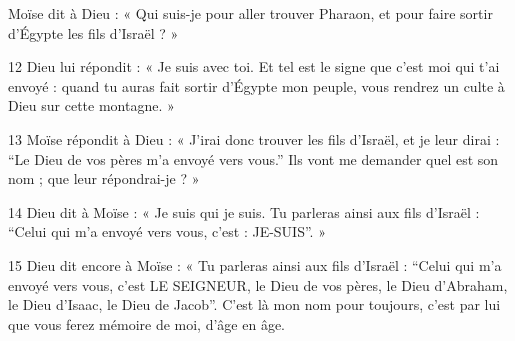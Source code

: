Moïse dit à Dieu : « Qui suis-je pour aller trouver Pharaon, et pour faire sortir d’Égypte les fils d’Israël ? »

12 Dieu lui répondit : « Je suis avec toi. Et tel est le signe que c’est moi qui t’ai envoyé : quand tu auras fait sortir d’Égypte mon peuple, vous rendrez un culte à Dieu sur cette montagne. »

13 Moïse répondit à Dieu : « J’irai donc trouver les fils d’Israël, et je leur dirai : “Le Dieu de vos pères m’a envoyé vers vous.” Ils vont me demander quel est son nom ; que leur répondrai-je ? »

14 Dieu dit à Moïse : « Je suis qui je suis. Tu parleras ainsi aux fils d’Israël : “Celui qui m’a envoyé vers vous, c’est : JE-SUIS”. »

15 Dieu dit encore à Moïse : « Tu parleras ainsi aux fils d’Israël : “Celui qui m’a envoyé vers vous, c’est LE SEIGNEUR, le Dieu de vos pères, le Dieu d’Abraham, le Dieu d’Isaac, le Dieu de Jacob”. C’est là mon nom pour toujours, c’est par lui que vous ferez mémoire de moi, d’âge en âge.